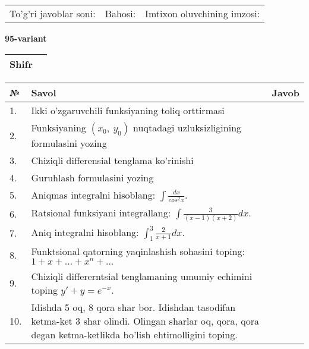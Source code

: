 \documentclass{article}
\begin{document}
  \vspace{1cm}
  
  \begin{tabular}{lll}
  To'g'ri javoblar soni: \underline{\hspace{1.5cm}} & 
  Bahosi: \underline{\hspace{1.5cm}} & 
  Imtixon oluvchining imzosi: \underline{\hspace{2cm}} \\
  \end{tabular}
  
  \egroup
  
  \newpage
  
  
  \textbf{95-variant}\\
  
  \bgroup
  \def\arraystretch{1.6} %
  
  \begin{tabular}{|m{5.7cm}|m{9.5cm}|}
  \hline
  Shifr & \\
  \hline
  \end{tabular}
  
  \vspace{1cm}
  
  \begin{tabular}{|m{0.7cm}|m{10cm}|m{4cm}|}
  \hline
  № & Savol & Javob \\
  \hline
  1. & Ikki o'zgaruvchili funksiyaning toliq orttirmasi &  \\
  \hline
  2. & Funksiyaning \((x_{0},\ y_{0})\) nuqtadagi uzluksizligining formulasini yozing &  \\
  \hline
  3. & Chiziqli differensial tenglama ko'rinishi &  \\
  \hline
  4. & Guruhlash formulasini yozing &  \\
  \hline
  5. & Aniqmas integralni hisoblang: \(\int \frac{dx}{cos^{2}x}\). &  \\
  \hline
  6. & Ratsional funksiyani integrallang: \(\int {\frac{3}{(x - 1)(x + 2)}dx}\). &  \\
  \hline
  7. & Aniq integralni hisoblang: \(\int_{1}^{3}\frac{2}{x + 1}dx\). &  \\
  \hline
  8. & Funktsional qatorning yaqinlashish sohasini toping:\(1 + x + ... + x^{n} + ...\) &  \\
  \hline
  9. & Chiziqli differerntsial tenglamaning umumiy echimini toping \(y' + y = e^{- x}\). &  \\
  \hline
  10. & Idishda 5 oq, 8 qora shar bor. Idishdan tasodifan ketma-ket 3 shar olindi. Olingan sharlar oq, qora, qora degan ketma-ketlikda bo'lish ehtimolligini toping. &  \\
  \hline
  \end{tabular}
  
\end{document}
